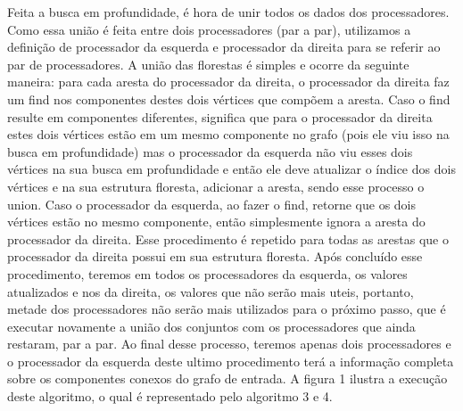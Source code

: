\documentclass[12pt]{article}
\begin{document}
Feita a busca em profundidade, é hora de unir todos os dados dos processadores. Como essa união é feita entre dois processadores (par a par), utilizamos a definição de processador da esquerda e processador da direita para se referir ao par de processadores. A união das florestas é simples e ocorre da seguinte maneira: para cada aresta do processador da direita, o processador da direita faz um find nos componentes destes dois vértices que compõem a aresta. Caso o find resulte em componentes diferentes, significa que para o processador da direita estes dois vértices estão em um mesmo componente no grafo (pois ele viu isso na busca em profundidade) mas o processador da esquerda não viu esses dois vértices na sua busca em profundidade e então ele deve atualizar o índice dos dois vértices e na sua estrutura floresta, adicionar a aresta, sendo esse processo o union. Caso o processador da esquerda, ao fazer o find, retorne que os dois vértices estão no mesmo componente, então simplesmente ignora a aresta do processador da direita. Esse procedimento é repetido para todas as arestas que o processador da direita possui em sua estrutura floresta. Após concluído esse procedimento, teremos em todos os processadores da esquerda, os valores atualizados e nos da direita, os valores que não serão mais uteis, portanto, metade dos processadores não serão mais utilizados para o próximo passo, que é executar novamente a união dos conjuntos com os processadores que ainda restaram, par a par. Ao final desse processo, teremos apenas dois processadores e o processador da esquerda deste ultimo procedimento terá a informação completa sobre os componentes conexos do grafo de entrada. A figura 1 ilustra a execução deste algoritmo, o qual é representado pelo algoritmo 3 e 4.
\end{document}
